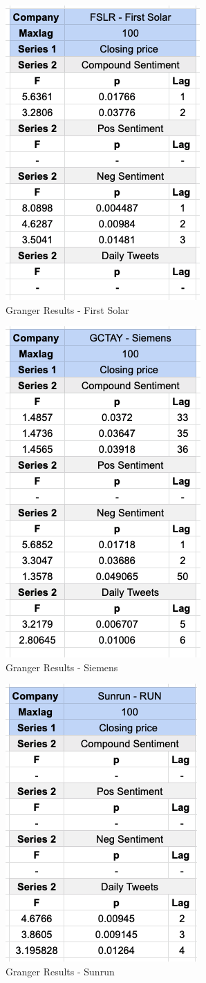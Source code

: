 \documentclass[sigconf, nonacm]{acmart}
\begin{document}
\begin{figure}[H]
  \centering
  \includegraphics[width=0.4\linewidth]{granger_results/granger_first_solar.png}
  \caption{Granger Results - First Solar}
  \label{granger_first_solar}
\end{figure}

\begin{figure}[H]
  \centering
  \includegraphics[width=0.4\linewidth]{granger_results/granger_siemens.png}
  \caption{Granger Results - Siemens}
  \label{granger_siemens}
\end{figure}

\begin{figure}[H]
  \centering
  \includegraphics[width=0.4\linewidth]{granger_results/granger_sunrun.png}
  \caption{Granger Results - Sunrun}
  \label{granger_sunrun}
\end{figure}
\end{document}
